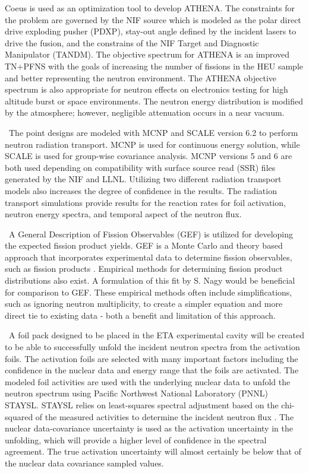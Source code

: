 Coeus is used as an optimization tool to develop ATHENA\cite{Bevins2018}. The constraints for the problem are governed by the NIF source which is modeled as the polar direct drive exploding pusher (PDXP), stay-out angle defined by the incident lasers to drive the fusion, and the constrains of the NIF Target and Diagnostic Manipulator (TANDM). The objective spectrum for ATHENA is an improved TN+PFNS with the goals of increasing the number of fissions in the HEU sample and better representing the neutron environment. The ATHENA objective spectrum is also appropriate for neutron effects on electronics testing for high altitude burst or space environments. The neutron energy distribution is modified by the atmosphere; however, negligible attenuation occurs in a near vacuum.  

\ The point designs are modeled with MCNP and SCALE version 6.2 to perform neutron radiation transport. 
MCNP is used for continuous energy solution, while SCALE is  used for group-wise covariance analysis. 
MCNP versions 5 and 6 are both used depending on compatibility with surface source read (SSR) files generated by the NIF and LLNL. 
Utilizing two different radiation transport models also increases the degree of confidence in the results. 
The radiation transport simulations provide results for the reaction rates for foil activation, neutron energy spectra, and temporal aspect of the neutron flux. 

\ A General Description of Fission Observables (GEF) is utilized for developing the expected fission product yields. 
GEF is a Monte Carlo and theory based approach that incorporates experimental data to determine fission observables, such as fission products \cite{Schmidt2016}. 
Empirical methods for determining fission product distributions also exist. 
A formulation of this fit by S. Nagy would be beneficial for comparison to GEF\cite{Nagy1978}. 
These empirical methods often include simplifications, such as ignoring neutron multiplicity, to create a simpler equation and more direct tie to existing data - both a benefit and limitation of this approach.  

\ A foil pack designed to be placed in the ETA experimental cavity will be created to be able to successfully unfold the incident neutron spectra from the activation foils. 
The activation foils are selected with many important factors including the confidence in the nuclear data and energy range that the foils are activated. 
The modeled foil activities are used with the underlying nuclear data to unfold the neutron spectrum using Pacific Northwest National Laboratory (PNNL) STAYSL. 
STAYSL relies on least-squares spectral adjustment based on the chi-squared of the measured activities to determine the incident neutron flux \cite{Greenwood2016}. 
The nuclear data-covariance uncertainty is used as the activation uncertainty in the unfolding, which will provide a higher level of confidence in the spectral agreement. 
The true activation uncertainty will almost certainly be below that of the nuclear data covariance sampled values. 


